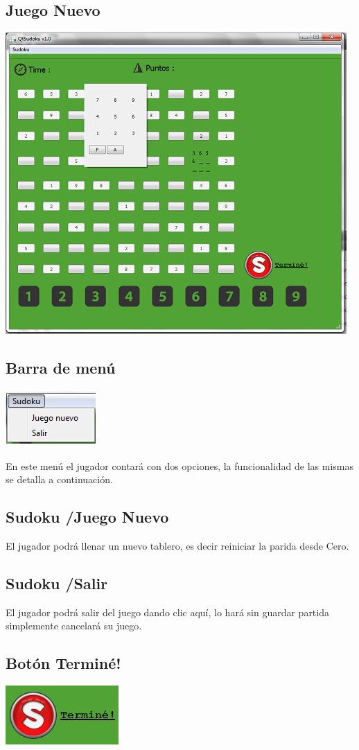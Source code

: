 \documentclass[a4paper,11pt]{article}
\begin{document}
\subsection{Juego Nuevo}
\includegraphics{tablero.png}
\subsection{Barra de menú}
\includegraphics{barra.png}

En este menú el jugador contará con dos opciones, la funcionalidad de las mismas se detalla a continuación.
\subsection{Sudoku /Juego Nuevo}
El jugador podrá llenar un nuevo tablero, es decir reiniciar la parida desde Cero.
\subsection{Sudoku /Salir}
El jugador podrá salir del juego dando clic aquí, lo hará sin guardar partida simplemente cancelará su juego.
\subsection{Botón Terminé!}
\includegraphics{termine.png}
\end{document}
